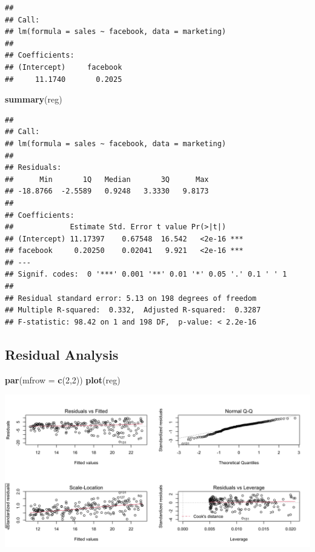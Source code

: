 \documentclass[]{book}
\newenvironment{Shaded}{\begin{snugshade}}{\end{snugshade}}
\newcommand{\DataTypeTok}[1]{\textcolor[rgb]{0.13,0.29,0.53}{#1}}
\newcommand{\DecValTok}[1]{\textcolor[rgb]{0.00,0.00,0.81}{#1}}
\newcommand{\KeywordTok}[1]{\textcolor[rgb]{0.13,0.29,0.53}{\textbf{#1}}}
\newcommand{\NormalTok}[1]{#1}
\begin{document}
\begin{verbatim}
## 
## Call:
## lm(formula = sales ~ facebook, data = marketing)
## 
## Coefficients:
## (Intercept)     facebook  
##     11.1740       0.2025
\end{verbatim}

\begin{Shaded}
\begin{Highlighting}[]
\KeywordTok{summary}\NormalTok{(reg)}
\end{Highlighting}
\end{Shaded}

\begin{verbatim}
## 
## Call:
## lm(formula = sales ~ facebook, data = marketing)
## 
## Residuals:
##      Min       1Q   Median       3Q      Max 
## -18.8766  -2.5589   0.9248   3.3330   9.8173 
## 
## Coefficients:
##             Estimate Std. Error t value Pr(>|t|)    
## (Intercept) 11.17397    0.67548  16.542   <2e-16 ***
## facebook     0.20250    0.02041   9.921   <2e-16 ***
## ---
## Signif. codes:  0 '***' 0.001 '**' 0.01 '*' 0.05 '.' 0.1 ' ' 1
## 
## Residual standard error: 5.13 on 198 degrees of freedom
## Multiple R-squared:  0.332,  Adjusted R-squared:  0.3287 
## F-statistic: 98.42 on 1 and 198 DF,  p-value: < 2.2e-16
\end{verbatim}

\hypertarget{residual-analysis}{%
\subsection{Residual Analysis}\label{residual-analysis}}

\begin{Shaded}
\begin{Highlighting}[]
\KeywordTok{par}\NormalTok{(}\DataTypeTok{mfrow =} \KeywordTok{c}\NormalTok{(}\DecValTok{2}\NormalTok{,}\DecValTok{2}\NormalTok{))}
\KeywordTok{plot}\NormalTok{(reg)}
\end{Highlighting}
\end{Shaded}

\begin{center}\includegraphics{figure/unnamed-chunk-29-1} \end{center}
\end{document}
